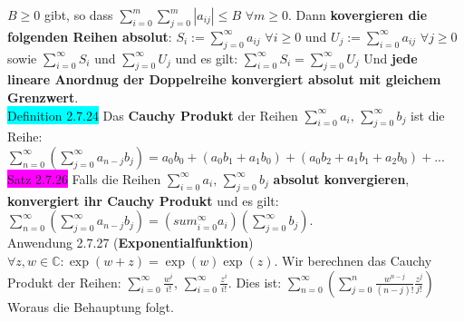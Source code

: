 \documentclass[landscape, 10pt]{article}
\newcommand{\C}{\mathbb{C}}
\begin{document}
\begin{multicols}{3}
                     \textcolor{NavyBlue}{$B\geqslant0$} gibt, so dass 
                     \textcolor{NavyBlue}{
                     $\sum_{i=0}^m\sum_{j=0}^m|a_{ij}|\leqslant B$\quad
                     $\forall m\geqslant0$}.
                     Dann 
                     \textbf{kovergieren die folgenden Reihen absolut}: 
                     \textcolor{NavyBlue}{$S_i:=\sum_{j=0}^\infty a_{ij}$\quad
                     $\forall i\geqslant0$} 
                     und 
                     \textcolor{NavyBlue}{$U_j:=\sum_{i=0}^\infty a_{ij}$\quad
                     $\forall j\geqslant0$}
                     sowie 
                     \textcolor{NavyBlue}{$\sum_{i=0}^\infty S_i$} 
                     und \textcolor{NavyBlue}{$\sum_{j=0}^\infty U_j$}
                     und es gilt: 
                     \textcolor{NavyBlue}{
                     $\sum_{i=0}^\infty S_i=\sum_{j=0}^\infty U_j$}
                     Und \textbf{jede lineare Anordnug der Doppelreihe konvergiert 
                     absolut mit gleichem Grenzwert}.\\
              \colorbox{cyan}{Definition 2.7.24} 
                     Das \textbf{Cauchy Produkt} der Reihen 
                     \textcolor{NavyBlue}{
                     $\sum_{i=0}^\infty a_i,\,\sum_{j=0}^\infty b_j$} 
                     ist die Reihe: 
                     \textcolor{NavyBlue}{
                     $\sum_{n=0}^\infty(\sum_{j=0}^\infty a_{n-j}b_j)
                     =a_0b_0+(a_0b_1+a_1b_0)+(a_0b_2+a_1b_1+a_2b_0)+...$}\\
              \colorbox{magenta}{Satz 2.7.26} Falls die Reihen 
                     \textcolor{NavyBlue}{
                     $\sum_{i=0}^\infty a_i,\,\sum_{j=0}^\infty b_j$}
                     \textbf{absolut konvergieren}, 
                     \textbf{konvergiert ihr Cauchy Produkt} und es gilt: 
                     \textcolor{NavyBlue}{
                     $\sum_{n=0}^\infty(\sum_{j=0}^\infty a_{n-j}b_j)
                     =(sum_{i=0}^\infty a_i)(\sum_{j=0}^\infty b_j)$}.\\
              \colorbox{Dandelion}{Anwendung 2.7.27} 
              (\textbf{Exponentialfunktion})
                     $\forall z,w\in\C:\exp(w+z)
                     =\exp(w)\exp(z)$. Wir berechnen das Cauchy Produkt der 
                     Reihen: $\sum_{i=0}^\infty\frac{w^i}{i!}$,
                     $\sum_{i=0}^\infty\frac{z^i}{i!}$.
                     Dies ist:
                     $\sum_{n=0}^\infty(\sum_{j=0}^n\frac{w^{n-j}}{(n-j)!}
                     \frac{z^j}{j!})$ Woraus die Behauptung folgt.\\

\end{multicols}
\end{document}
